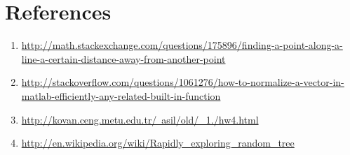 \documentclass{article}
\begin{document}
\section{References}
\begin{enumerate}
	\item \href{url}{http://math.stackexchange.com/questions/175896/finding-a-point-along-a-line-a-certain-distance-away-from-another-point}
	\item \href{url}{http://stackoverflow.com/questions/1061276/how-to-normalize-a-vector-in-matlab-efficiently-any-related-built-in-function}
	\item \href{url}{http://kovan.ceng.metu.edu.tr/~asil/old/\_1./hw4.html}
	\item \href{url}{http://en.wikipedia.org/wiki/Rapidly\_exploring\_random\_tree}
\end{enumerate}
\end{document}
